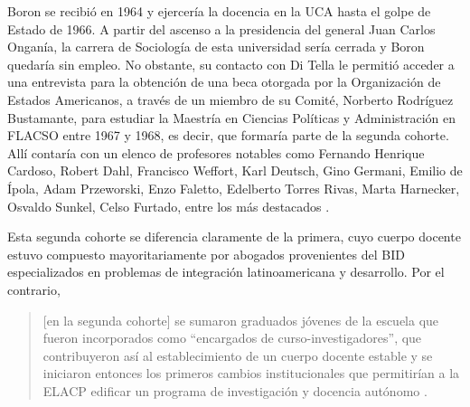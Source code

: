 Boron se recibió en 1964 y ejercería la docencia en la UCA hasta el golpe de Estado de 1966. A partir del ascenso a la presidencia del general Juan Carlos Onganía, la carrera de Sociología de esta universidad sería cerrada y Boron quedaría sin empleo. No obstante, su contacto con Di Tella le permitió acceder a una entrevista para la obtención de una beca otorgada por la Organización de Estados Americanos, a través de un miembro de su Comité, Norberto Rodríguez Bustamante, para estudiar la Maestría en Ciencias Políticas y Administración en FLACSO entre 1967 y 1968, es decir, que formaría parte de la segunda cohorte. Allí contaría con un elenco de profesores notables como Fernando Henrique Cardoso, Robert Dahl, Francisco Weffort, Karl Deutsch, Gino Germani, Emilio de Ípola, Adam Przeworski, Enzo Faletto, Edelberto Torres Rivas, Marta Harnecker, Osvaldo Sunkel, Celso Furtado, entre los más destacados \parencite{1444-BORON2023}.

Esta segunda cohorte se diferencia claramente de la primera, cuyo cuerpo docente estuvo compuesto mayoritariamente por abogados provenientes del BID especializados en problemas de integración latinoamericana y desarrollo. Por el contrario,

\begin{quote}
[en la segunda cohorte] se sumaron graduados jóvenes de la escuela que fueron incorporados como \enquote{encargados de curso-investigadores}, que contribuyeron así al establecimiento de un cuerpo docente estable y se iniciaron entonces los primeros cambios institucionales que permitirían a la ELACP edificar un programa de investigación y docencia autónomo \parencite[82]{1515-ABARZUACUTRONI2014}.
\end{quote}

